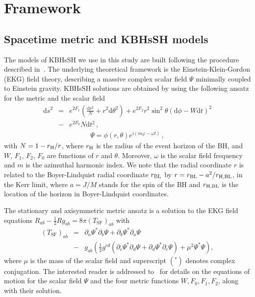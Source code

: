 \documentclass[twocolumn,aps,showpacs,showkeys,prd,superscriptaddress,byrevtex, amsmath]{revtex4-1}
\begin{document}
\section{Framework}
\label{framework}

\subsection{Spacetime metric and KBHsSH models}

The models of KBHsSH we use in this study are built following the procedure described in~\cite{Herdeiro:2015b}. The underlying theoretical framework is the Einstein-Klein-Gordon (EKG) field theory, describing a massive complex scalar field $\Psi$ minimally coupled to Einstein gravity. KBHsSH solutions are obtained by using the following ansatz for the metric and the scalar field~\cite{Herdeiro:2014a}
\begin{eqnarray}
\mathrm{d}s^2 &=& e^{2F_1}\left(\frac{\mathrm{d}r^2}{N} + r^2\mathrm{d}\theta^2\right) +  e^{2F_2}r^2\sin^2 \theta(\mathrm{d}\phi-W\mathrm{d}t)^2 
\nonumber \\ 
&-&  e^{2F_0}N\mathrm{d}t^2\,,
\label{metric}
\end{eqnarray}
\begin{eqnarray}
\Psi = \phi(r, \theta) e^{\mathrm{i}(m\varphi - \omega t)} \,,
\end{eqnarray}
with $N = 1 - r_{\rm H}/r$, where $r_{\rm H}$ is the radius of the event horizon of the BH, and $W$, $F_1$, $F_2$, $F_0$ are functions of $r$ and $\theta$. Moreover, $\omega$ is the scalar field frequency and $m$ is the azimuthal harmonic index.
We note that the radial coordinate $r$ is related to the Boyer-Lindquist radial coordinate $r_{\rm BL}$ by $r=r_{\rm BL}-a^2/r_{\rm H,BL}$, in the Kerr limit, where $a = J/M$ stands for the spin of the BH and $r_{\rm H,BL}$ is the location of the horizon in Boyer-Lindquist coordinates.

The stationary and axisymmetric metric ansatz is a solution to the EKG field equations $R_{ab} - \frac{1}{2}R g _{ab} = 8 \pi (T_{\mathrm{SF}})_{ab}$ with 
\begin{eqnarray}\label{eq:e-m_scalaf_field}
(T_{\mathrm{SF}})_{ab} &=& \partial_a \Psi^* \partial_b \Psi + \partial_b \Psi^* \partial_a \Psi 
 \\ 
&-& g_{ab} \left(\frac{1}{2} g^{cd}(\partial_c \Psi^* \partial_d \Psi + \partial_d \Psi^* \partial_c \Psi) + \mu^2 \Psi^* \Psi \right), \nonumber
\end{eqnarray}
where $\mu$ is the mass of the scalar field and superscript $(^*)$ denotes complex conjugation. The interested reader is addressed to~\cite{Herdeiro:2015b} for details on the equations of motion for the scalar field $\Psi$ and the four metric functions ${W, F_0,F_1,F_2}$, along with their solution.
\end{document}
